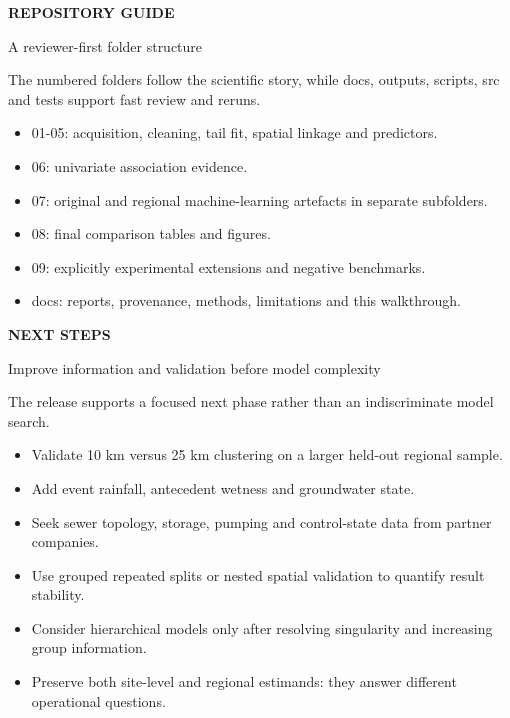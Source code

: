 \documentclass[10pt]{article}
\begin{document}
\vfill{}
\clearpage
{\color{teal}\small\bfseries REPOSITORY GUIDE}\par
{}\par
\small A reviewer-first folder structure\par\vspace{5mm}
The numbered folders follow the scientific story, while docs, outputs, scripts, src and tests support fast review and reruns.
\begin{itemize}[leftmargin=5mm]
\item 01-05: acquisition, cleaning, tail fit, spatial linkage and predictors.
\item 06: univariate association evidence.
\item 07: original and regional machine-learning artefacts in separate subfolders.
\item 08: final comparison tables and figures.
\item 09: explicitly experimental extensions and negative benchmarks.
\item docs: reports, provenance, methods, limitations and this walkthrough.
\end{itemize}
\vfill{}
\clearpage
{\color{teal}\small\bfseries NEXT STEPS}\par
{}\par
\small Improve information and validation before model complexity\par\vspace{5mm}
The release supports a focused next phase rather than an indiscriminate model search.
\begin{itemize}[leftmargin=5mm]
\item Validate 10 km versus 25 km clustering on a larger held-out regional sample.
\item Add event rainfall, antecedent wetness and groundwater state.
\item Seek sewer topology, storage, pumping and control-state data from partner companies.
\item Use grouped repeated splits or nested spatial validation to quantify result stability.
\item Consider hierarchical models only after resolving singularity and increasing group information.
\item Preserve both site-level and regional estimands: they answer different operational questions.
\end{itemize}
\vfill{}
\end{document}
